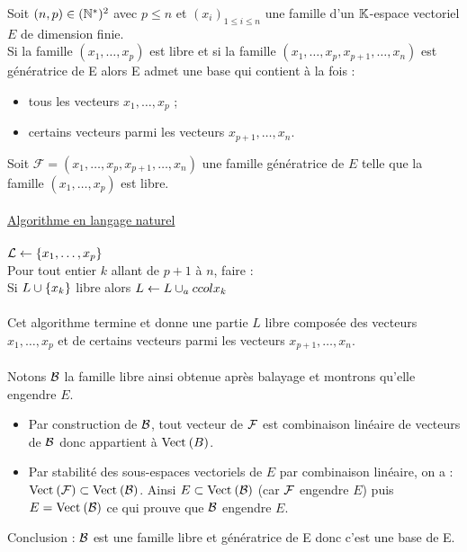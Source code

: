 \begin{defprop}
    Soit \((n, p) \in (\Ns)^2\) avec \(p \leq n\) et \((x_i)_{1\leq i\leq n}\) une famille d’un \(\K\)-espace vectoriel \(E\) de dimension finie.\\
    Si la famille \((x_1, \dots , x_p)\) est libre et si la famille \( (x_1, \dots , x_p, x_{p+1}, \dots , x_n)\) est génératrice de E alors E admet une base qui contient à la fois :
    \begin{itemize}
        \item tous les vecteurs \(x_1, \dots , x_p\) ;
        \item certains vecteurs parmi les vecteurs \(x_{p+1}, \dots , x_n\).
    \end{itemize}

\end{defprop}
\begin{dem}
    Soit \(\mathcal{F} = (x_1, \dots , x_p, x_{p+1}, \dots , x_n)\) une famille génératrice de \(E\) telle que la famille \((x_1, \dots , x_p)\) est libre.\\~\\
    \underline{Algorithme en langage naturel}\\~\\
    \(\cal{L} \leftarrow  \accol{x_1, \dots , x_p}\)\\
    Pour tout entier \(k\) allant de \(p + 1\) à \(n\), faire : \\
    \qquad Si \(L \union \accol{x_k}\) libre alors \(L \leftarrow L \union _accol{x_k}\) \\~\\
    Cet algorithme termine et donne une partie \(L\) libre composée des vecteurs \(x_1, \dots , x_p\) et de certains vecteurs parmi les vecteurs \(x_{p+1}, \dots , x_n\).\\~\\
    Notons \(\cal{B}\) la famille libre ainsi obtenue après balayage et montrons qu’elle engendre \(E\).
    \begin{itemize}
        \item Par construction de \(\cal{B}\), tout vecteur de \(\cal{F}\) est combinaison linéaire de vecteurs de \(\cal{B}\) donc appartient à \(\Vect{B}\).
        \item Par stabilité des sous-espaces vectoriels de \(E\) par combinaison linéaire, on a : \(\Vect{\cal{F}} \subset \Vect{\cal{B}}\).
        Ainsi \(E \subset \Vect{\cal{B}}\) (car \(\cal{F}\) engendre \(E\)) puis \(E = \Vect{\cal{B}}\) ce qui prouve que \(\cal{B}\) engendre \(E\).
    \end{itemize}

Conclusion : \(\cal{B}\) est une famille libre et génératrice de E donc c’est une base de E.
\end{dem}

